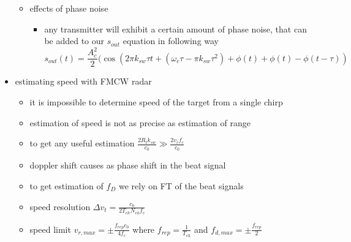 \documentclass[a4paper,12pt]{report}
\begin{document}
\begin{itemize}
\begin{itemize}
\begin{itemize}
				\end{itemize}
			\item effects of phase noise
				\begin{itemize}
					\item any transmitter will exhibit a certain amount of phase noise, that can be added to our $s_{out}$ equation in following way
						\[
							s_{out}(t) = \frac{A_c^2}{2} (\cos(2\pi k_{sw} \tau t + (\omega_c \tau - \pi k_{sw} \tau^2)+\phi(t) + \phi(t) - \phi(t-\tau))
						\]
				\end{itemize}
		\end{itemize}
	\item estimating speed with FMCW radar
		\begin{itemize}
			\item it is impossible to determine speed of the target from a single chirp
			\item estimation of speed is not as precise as estimation of range
			\item to get any useful estimation $\frac{2R_t k_{sw}}{c_0} \gg \frac{2v_r f_c}{c_0}$
			\item doppler shift causes as phase shift in the beat signal
			\item to get estimation of $f_D$ we rely on FT of the beat signals
			\item speed resolution $\Delta v_t = \frac{c_0}{2T_{ch}N_{ch}f_c} $
			\item speed limit $v_{r,max} = \pm \frac{f_{rep} c_0}{4f_c}$ where $f_{rep} = \frac{1}{T_{ch}}$ and $f_{d, max}= \pm \frac{f_{rep}}{2} $
		\end{itemize}
\end{itemize}
\end{document}
